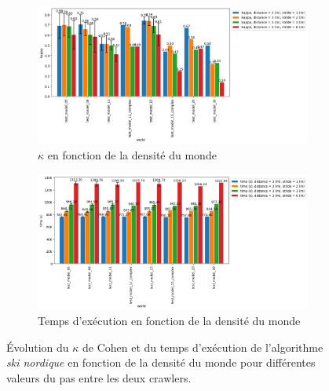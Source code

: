 \documentclass[francais,RandD]{rapportPFE}
\begin{document}
			\begin{figure}[h!]
				\centering
				\begin{subfigure}[t]{0.9\linewidth}
					\includegraphics[width=\linewidth]{graphics/ski_nordique-kappa_vs_world_for_each_s.png}
					\caption{$\kappa$ en fonction de la densité du monde}
					\label{fig:ski_nordique-kappa_vs_world_s}
				\end{subfigure}
				\hfill
				\begin{subfigure}[t]{0.9\linewidth}
						\includegraphics[width=\linewidth]{graphics/ski_nordique-time_vs_world_for_each_s.png}
						\caption{Temps d'exécution en fonction de la densité du monde}
						\label{fig:ski_nordique-time_vs_world_s}
				\end{subfigure}
				\caption{Évolution du $\kappa$ de Cohen et du temps d'exécution de l'algorithme \textit{ski nordique} en fonction de la densité du monde pour différentes valeurs du pas entre les deux crawlers.}
				\label{fig:ski_nordique-world_s}
			\end{figure}
\end{document}
